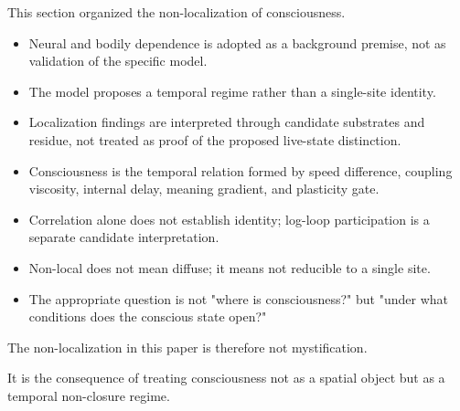 This section organized the non-localization of consciousness.

\begin{itemize}
\item Neural and bodily dependence is adopted as a background premise, not as validation of the specific model.
\item The model proposes a temporal regime rather than a single-site identity.
\item Localization findings are interpreted through candidate substrates and residue, not treated as proof of the proposed live-state distinction.
\item Consciousness is the temporal relation formed by speed difference, coupling viscosity, internal delay, meaning gradient, and plasticity gate.
\item Correlation alone does not establish identity; log-loop participation is a separate candidate interpretation.
\item Non-local does not mean diffuse; it means not reducible to a single site.
\item The appropriate question is not "where is consciousness?" but "under what conditions does the conscious state open?"
\end{itemize}

The non-localization in this paper is therefore not mystification.

It is the consequence of treating consciousness not as a spatial object but as a temporal non-closure regime.
